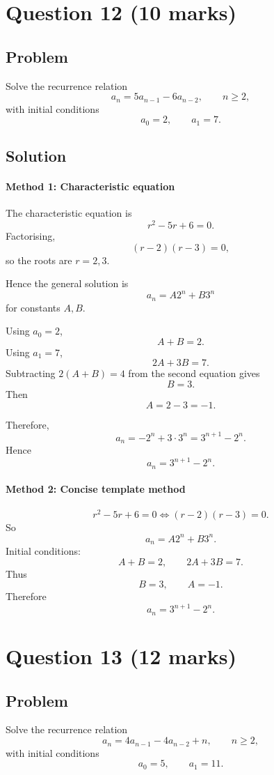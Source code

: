 \documentclass[12pt]{article}
\begin{document}
\newpage
\section{Question 12 \hfill (10 marks)}
\subsection{Problem}

Solve the recurrence relation
\[
a_n=5a_{n-1}-6a_{n-2},\qquad n\ge 2,
\]
with initial conditions
\[
a_0=2,\qquad a_1=7.
\]

\subsection{Solution}

\paragraph{Method 1: Characteristic equation}

The characteristic equation is
\[
r^2-5r+6=0.
\]
Factorising,
\[
(r-2)(r-3)=0,
\]
so the roots are $r=2,3$.

Hence the general solution is
\[
a_n=A2^n+B3^n
\]
for constants $A,B$.

Using $a_0=2$,
\[
A+B=2.
\]
Using $a_1=7$,
\[
2A+3B=7.
\]
Subtracting $2(A+B)=4$ from the second equation gives
\[
B=3.
\]
Then
\[
A=2-3=-1.
\]

Therefore,
\[
a_n=-2^n+3\cdot 3^n=3^{n+1}-2^n.
\]
Hence
\[
\boxed{a_n=3^{n+1}-2^n.}
\]

\paragraph{Method 2: Concise template method}

\[
r^2-5r+6=0\iff (r-2)(r-3)=0.
\]
So
\[
a_n=A2^n+B3^n.
\]
Initial conditions:
\[
A+B=2,
\qquad
2A+3B=7.
\]
Thus
\[
B=3,
\qquad
A=-1.
\]
Therefore
\[
\boxed{a_n=3^{n+1}-2^n.}
\]

\newpage
\section{Question 13 \hfill (12 marks)}
\subsection{Problem}

Solve the recurrence relation
\[
a_n=4a_{n-1}-4a_{n-2}+n,\qquad n\ge 2,
\]
with initial conditions
\[
a_0=5,\qquad a_1=11.
\]
\end{document}
